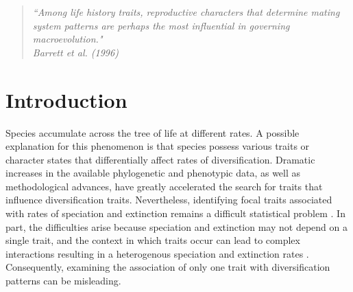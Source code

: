 \begin{quote}
\em{``Among life history traits, reproductive characters that determine mating system patterns are perhaps the most influential in governing macroevolution." 
}
\\
\hspace*{\fill}\rm{ Barrett et al. (1996)}
\end{quote}

\section{Introduction}



Species accumulate across the tree of life at different rates. 
A possible explanation for this phenomenon is that species possess various traits or character states that differentially affect rates of diversification. 
Dramatic increases in the available phylogenetic and phenotypic data, as well as methodological advances, have greatly accelerated the search for traits that influence diversification traits.
Nevertheless, identifying focal traits associated with rates of speciation and extinction remains a difficult statistical problem \citep[\eg][]{maddison_2015, rabosky_2015, moore_2016, fitzjohn_2009, goldberg_2012, beaulieu_2016, rabosky_2017}. %
In part, the difficulties arise because speciation and extinction may not depend on a single trait, and the context in which traits occur can lead to complex interactions resulting in a heterogenous speciation and extinction rates \citep{beaulieu_2016, caetano_2018, herrera_2018}.
Consequently, examining the association of only one trait with diversification patterns can be misleading. 

